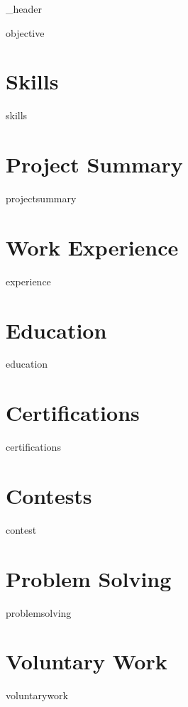\documentclass[letter,10pt]{article}
\author{Omar Faruk Pial} %
\begin{document}
{_header}

{objective}
\vspace*{7pt}

\section{Skills}
\vspace*{3pt}
{skills}
\vspace*{7pt}

\section{Project Summary}
\vspace*{3pt}
{projectsummary}
\vspace*{7pt}

\section{Work Experience}
{experience}
\vspace*{7pt}

\section{Education}
{education}
\vspace*{7pt}

\section{Certifications}
{certifications}
\vspace*{7pt}


\section{Contests}
{contest}
\vspace*{7pt}

\section{Problem Solving}
{problemsolving}
\vspace*{7pt}

\section{Voluntary Work}
{voluntarywork}
\vspace*{7pt}
\end{document}
